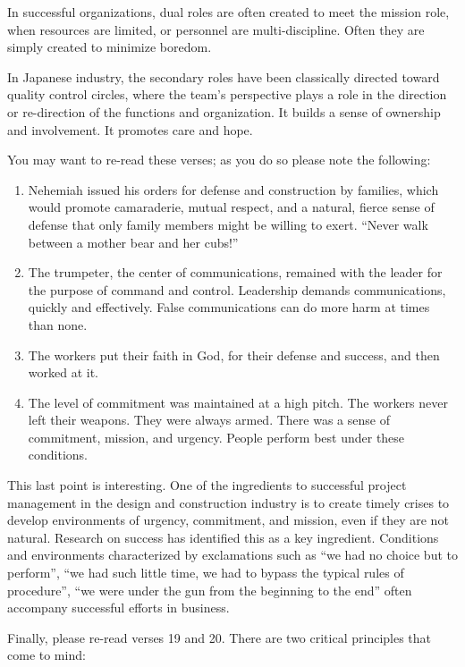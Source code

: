 \documentclass[12pt]{memoir}
\begin{document}
In successful organizations, dual roles are often created to meet the mission role, when resources are limited, or personnel are multi-discipline. Often they are simply created to minimize
boredom.

In Japanese industry, the secondary roles have been classically directed toward quality control circles, where the team's perspective plays a role in the direction or re-direction of the functions and organization. It builds a sense of ownership and involvement. It promotes care and hope.

You may want to re-read these verses; as you do so please note the following:

\begin{enumerate}
\item Nehemiah issued his orders for defense and construction by families, which would promote camaraderie, mutual respect, and a natural, fierce sense of defense that only family members might be willing to exert. ``Never walk between a mother bear and her cubs!''

\item The trumpeter, the center of communications, remained with the leader for the purpose of command and control. Leadership demands communications, quickly and effectively. False communications can do more harm at times than none.

\item The workers put their faith in God, for their defense and success, and then worked at it.

\item The level of commitment was maintained at a high pitch. The workers never
left their weapons. They were always armed. There was a sense of commitment, mission, and urgency. People perform best under these conditions. 
\end{enumerate}

This last point is interesting. One of the ingredients to successful project management in the design and construction industry is to create timely crises to develop environments of urgency, commitment, and mission, even if they are not natural. Research on success has
identified this as a key ingredient.
Conditions and environments characterized by exclamations such as ``we had no choice but to perform'', ``we had such little time, we had to bypass the typical rules of procedure'', ``we were under the gun from the beginning to the end'' often accompany successful efforts in business.

Finally, please re-read verses  19 and 20. There are two critical principles that come to mind: 
\end{document}
